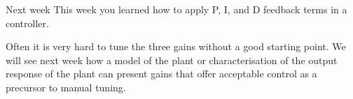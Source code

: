 \documentclass[9pt]{beamer-control}
\begin{document}
\begin{frame}{Next week}
This week you learned how to apply P, I, and D feedback terms in a controller.

Often it is very hard to tune the three gains without a good starting point. We will see next week how a model of the plant or characterisation of the output response of the plant can present gains that offer acceptable control as a precursor to manual tuning. 
\end{frame}

\SUMMARYFRAME
\end{document}
